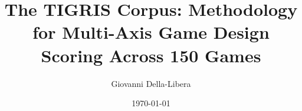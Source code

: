 \documentclass{article}
\title{The TIGRIS Corpus: Methodology for Multi-Axis Game Design\\
Scoring Across 150 Games}
\author{Giovanni Della-Libera}
\date{\today}
\begin{document}
\maketitle

\begin{abstract}

\end{abstract}










\end{document}
